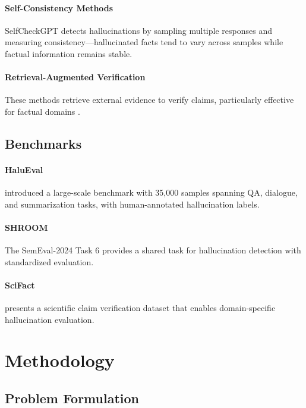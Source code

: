 \documentclass[11pt]{article}
\begin{document}
\paragraph{Self-Consistency Methods} SelfCheckGPT \cite{manakul2023selfcheckgpt} detects hallucinations by sampling multiple responses and measuring consistency---hallucinated facts tend to vary across samples while factual information remains stable.

\paragraph{Retrieval-Augmented Verification} These methods retrieve external evidence to verify claims, particularly effective for factual domains \cite{thorne2018fever}.

\subsection{Benchmarks}

\paragraph{HaluEval} \citet{li2023halueval} introduced a large-scale benchmark with 35,000 samples spanning QA, dialogue, and summarization tasks, with human-annotated hallucination labels.

\paragraph{SHROOM} The SemEval-2024 Task 6 \cite{mickus2024shroom} provides a shared task for hallucination detection with standardized evaluation.

\paragraph{SciFact} \citet{wadden2020fact} presents a scientific claim verification dataset that enables domain-specific hallucination evaluation.

\section{Methodology}

\subsection{Problem Formulation}
\end{document}
